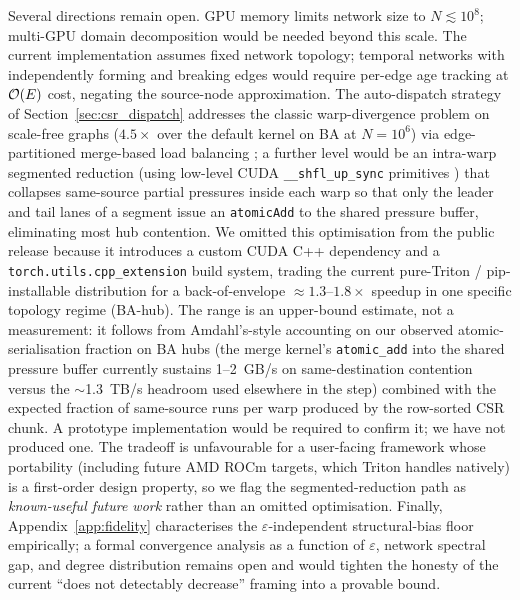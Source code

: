 Several directions remain open. GPU memory limits network size to $N \lesssim 10^8$; multi-GPU domain decomposition would be needed beyond this scale. The current implementation assumes fixed network topology; temporal networks with independently forming and breaking edges would require per-edge age tracking at $\mathcal{O}(E)$ cost, negating the source-node approximation. The auto-dispatch strategy of Section~\ref{sec:csr_dispatch} addresses the classic warp-divergence problem on scale-free graphs ($4.5\times$ over the default kernel on BA at $N = 10^6$) via edge-partitioned merge-based load balancing \citep{merrill2016merge}; a further level would be an intra-warp segmented reduction (using low-level CUDA \texttt{\_\_shfl\_up\_sync} primitives \citep{nvidia2024cudagraphs}) that collapses same-source partial pressures inside each warp so that only the leader and tail lanes of a segment issue an \texttt{atomicAdd} to the shared pressure buffer, eliminating most hub contention. We omitted this optimisation from the public release because it introduces a custom CUDA C++ dependency and a \texttt{torch.utils.cpp\_extension} build system, trading the current pure-Triton / pip-installable distribution for a back-of-envelope $\approx 1.3$--$1.8\times$ speedup in one specific topology regime (BA-hub). The range is an upper-bound estimate, not a measurement: it follows from Amdahl's-style accounting on our observed atomic-serialisation fraction on BA hubs (the merge kernel's \texttt{atomic\_add} into the shared pressure buffer currently sustains 1--2~GB/s on same-destination contention versus the $\sim$1.3~TB/s headroom used elsewhere in the step) combined with the expected fraction of same-source runs per warp produced by the row-sorted CSR chunk. A prototype implementation would be required to confirm it; we have not produced one. The tradeoff is unfavourable for a user-facing framework whose portability (including future AMD ROCm targets, which Triton handles natively) is a first-order design property, so we flag the segmented-reduction path as \emph{known-useful future work} rather than an omitted optimisation. Finally, Appendix~\ref{app:fidelity} characterises the $\varepsilon$-independent structural-bias floor empirically; a formal convergence analysis as a function of $\varepsilon$, network spectral gap, and degree distribution remains open and would tighten the honesty of the current ``does not detectably decrease'' framing into a provable bound.

